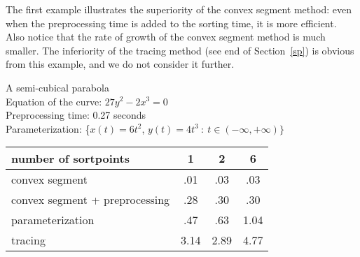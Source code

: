 The first example illustrates the superiority of the convex segment method:
even when the preprocessing time is added to the sorting time, it is more efficient.
Also notice that the rate of growth of the convex segment method is much smaller.
The inferiority of the tracing method (see end of Section~\ref{sp})
is obvious from this example, and we do not consider it further.
%
\begin{example}
A semi-cubical parabola\\
Equation of the curve: $27 y^{2} - 2x^{3} = 0$\\
Preprocessing time: 0.27 seconds\\
Parameterization: \{$x(t) = 6t^{2}$,\vspace{.5in} $y(t) = 4t^{3}\ :\ 
t \in (-\infty, +\infty) \}$\\
%
\begin{tabular}{|l|c|c|c|}  \hline
number of sortpoints & 1 & 2 & 6 \\ \hline \hline
convex segment &           .01 & .03 & .03 \\ \hline
convex segment + preprocessing & .28 & .30 & .30 \\ \hline
parameterization & .47 & .63 & 1.04 \\ \hline
tracing         & 3.14 & 2.89 & 4.77 \\ \hline
\end{tabular}
\end{example}


\clearpage

